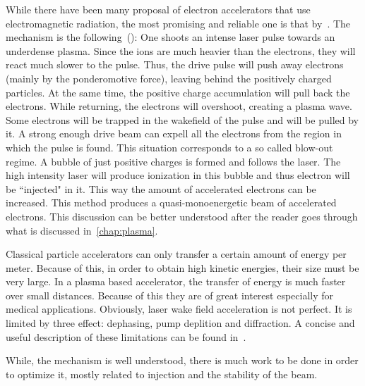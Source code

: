 \documentclass[12pt, class=report, crop=false]{standalone}
\begin{document}
While there have been many proposal of electron accelerators that use electromagnetic radiation, the most promising and reliable one is that by~\cite{tajimaLaserElectronAccelerator1979}. The mechanism is the following~(\cite{manglesIntroductionPlasmaWakefield}): One shoots an intense laser pulse towards an underdense plasma. Since the ions are much heavier than the electrons, they will react much slower to the pulse. Thus, the drive pulse will push away electrons (mainly by the ponderomotive force), leaving behind the positively charged particles. At the same time, the positive charge accumulation will pull back the electrons. While returning, the electrons will overshoot, creating a plasma wave. Some electrons will be trapped in the wakefield of the pulse and will be pulled by it. A strong enough drive beam can expell all the electrons from the region in which the pulse is found. This situation corresponds to a so called blow-out regime. A bubble of just positive charges is formed and follows the laser. The high intensity laser will produce ionization in this bubble and thus electron will be ``injected" in it. This way the amount of accelerated electrons can be increased. This method produces a quasi-monoenergetic beam of accelerated electrons. This discussion can be better understood after the reader goes through what is discussed in~\cref{chap:plasma}.

Classical particle accelerators can only transfer a certain amount of energy per meter. Because of this, in order to obtain high kinetic energies, their size must be very large. In a plasma based accelerator, the transfer of energy is much faster over small distances. Because of this they are of great interest especially for medical applications. Obviously, laser wake field acceleration is not perfect. It is limited by three effect: dephasing, pump deplition and diffraction. A concise and useful description of these limitations can be found in~\cite{oneilLaserWakefieldAcceleratior2017}.

While, the mechanism is well understood, there is much work to be done in order to optimize it, mostly related to injection and the stability of the beam.
\end{document}
